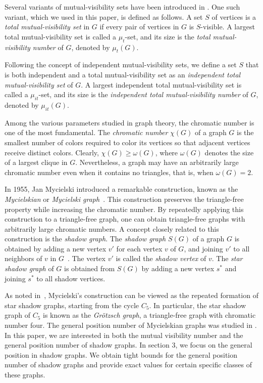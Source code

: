 \documentclass[a4paper,12pt]{article}
\begin{document}
Several variants of mutual-visibility sets have been introduced in \cite{mv1,mv3}. One such variant, which we used in this paper, is defined as follows. A set $S$ of vertices is a \emph{total mutual-visibility set} in $G$ if every pair of vertices in $G$ is $S$-visible. A largest total mutual-visibility set is called a $\mu_{t}$-set, and its size is the \emph{total mutual-visibility number} of $G$, denoted by $\mu_{t}(G)$.

Following the concept of independent mutual-visibility sets, we define a set $S$ that is both independent and a total mutual-visibility set as an \emph{independent total mutual-visibility set} of $G$. A largest independent total mutual-visibility set is called a $\mu_{it}$-set, and its size is the \emph{independent total mutual-visibility number} of $G$, denoted by $\mu_{it}(G)$.

Among the various parameters studied in graph theory, the chromatic number is one of the most fundamental. 
The \emph{chromatic number} $\chi(G)$ of a graph $G$ is the smallest number of colors required to color its vertices so that adjacent vertices receive distinct colors. 
Clearly, $\chi(G) \geq \omega(G)$, where $\omega(G)$ denotes the size of a largest clique in $G$. 
Nevertheless, a graph may have an arbitrarily large chromatic number even when it contains no triangles, that is, when $\omega(G) = 2$. 

In 1955, Jan Mycielski introduced a remarkable construction, known as the \emph{Mycielskian} or \emph{Mycielski graph}~\cite{mycielski}. 
This construction preserves the triangle-free property while increasing the chromatic number. 
By repeatedly applying this construction to a triangle-free graph, one can obtain triangle-free graphs with arbitrarily large chromatic numbers. A concept closely related to this construction is the \emph{shadow graph}. 
The \emph{shadow graph} $S(G)$ of a graph $G$ is obtained by adding a new vertex $v'$ for each vertex $v$ of $G$, and joining $v'$ to all neighbors of $v$ in $G$~\cite{11}. 
The vertex $v'$ is called the \emph{shadow vertex} of $v$.
The \emph{star shadow graph} of $G$ is obtained from $S(G)$ by adding a new vertex $s^*$ and joining $s^*$ to all shadow vertices.

As noted in~\cite{rcbook}, Mycielski’s construction can be viewed as the repeated formation of star shadow graphs, starting from the cycle $C_5$. 
In particular, the star shadow graph of $C_5$ is known as the \emph{Gr\"otzsch graph}, a triangle-free graph with chromatic number four. The general position number of Mycielskian graphs was studied in \cite{26}.
In this paper, we are interested in both the mutual visibility number and the general position number of shadow graphs. In section 3, we focus on the general position in shadow graphs. We obtain tight bounds for the general position number of shadow graphs and provide exact values for certain specific classes of these graphs. 
\end{document}
